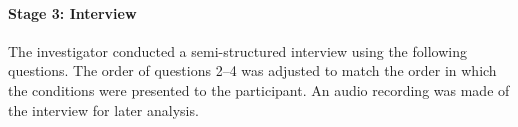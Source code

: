




\paragraph{Stage 3: Interview}

The investigator conducted a semi-structured interview using the following questions.  The order of questions 2--4 was
adjusted to match the order in which the conditions were presented to the participant.  An audio recording was made of
the interview for later analysis.

